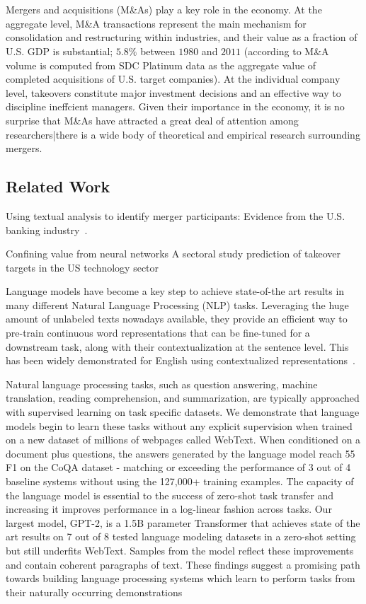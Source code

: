 \documentclass[11pt]{article}
\begin{document}
~\cite{routledge2013}

~\cite{linlin2018}


Mergers and acquisitions (M\&As) play a key role in the economy. At the aggregate level,
M\&A transactions represent the main mechanism for consolidation and restructuring within
industries, and their value as a fraction of U.S. GDP is substantial; $5.8\%$ between $1980$ and
$2011$ (according to M\&A volume is computed from SDC Platinum data as the aggregate value of completed acquisitions of
U.S. target companies). At the individual company level, takeovers constitute major investment decisions and
an effective way to discipline ineffcient managers. Given their importance in the economy, it
is no surprise that M\&As have attracted a great deal of attention among researchers|there
is a wide body of theoretical and empirical research surrounding
mergers.


\subsection{Related Work}


Using textual analysis to identify merger participants: Evidence from the U.S. banking industry~\cite{xxx}.

Confining value from neural networks
A sectoral study prediction of takeover targets
in the US technology sector


Language models have become a key step to achieve state-of-the art results in many different Natural Language Processing (NLP)
tasks. Leveraging the huge amount of unlabeled texts nowadays available, they provide an efficient way to pre-train continuous word
representations that can be fine-tuned for a downstream task, along with their contextualization at the sentence level. This has been
widely demonstrated for English using contextualized representations~\cite{dai2015, peters2018, howard2018, radford2018, devlin2019, yang2019}.

Natural language processing tasks, such as question answering, machine translation, reading comprehension, and summarization, are typically
approached with supervised learning on task specific datasets. We demonstrate that language
models begin to learn these tasks without any explicit supervision when trained on a new dataset
of millions of webpages called WebText. When
conditioned on a document plus questions, the answers generated by the language model reach 55
F1 on the CoQA dataset - matching or exceeding
the performance of 3 out of 4 baseline systems
without using the 127,000+ training examples.
The capacity of the language model is essential
to the success of zero-shot task transfer and increasing it improves performance in a log-linear
fashion across tasks. Our largest model, GPT-2,
is a 1.5B parameter Transformer that achieves
state of the art results on 7 out of 8 tested language modeling datasets in a zero-shot setting
but still underfits WebText. Samples from the
model reflect these improvements and contain coherent paragraphs of text. These findings suggest
a promising path towards building language processing systems which learn to perform tasks from
their naturally occurring demonstrations~\cite{radford2019} 
\end{document}
